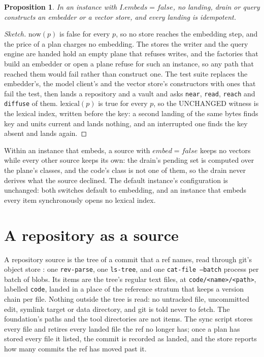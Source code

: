\documentclass[11pt]{article}
\theoremstyle{plain}
\newtheorem{proposition}{Proposition}
\theoremstyle{definition}
\theoremstyle{remark}
\newcommand{\code}[1]{\texttt{#1}}
\begin{document}
\begin{proposition}\label{prop:none}
In an instance with $I.\mathit{embeds}=\mathit{false}$, no landing, drain or query constructs an
embedder or a vector store, and every landing is idempotent.
\end{proposition}
\begin{proof}[Sketch]
$\mathrm{now}(p)$ is false for every $p$, so no store reaches the embedding step, and the price of a
plan charges no embedding. The stores the writer and the query engine are handed hold an empty
plane that refuses writes, and the factories that build an embedder or open a plane refuse for such
an instance, so any path that reached them would fail rather than construct one. The test suite
replaces the embedder's, the model client's and the vector store's constructors with ones that fail
the test, then lands a repository and a vault and asks \code{near}, \code{read}, \code{reach} and
\code{diffuse} of them.
$\mathrm{lexical}(p)$ is true for every $p$, so the UNCHANGED witness is the lexical index, written
before the key: a second landing of the same bytes finds key and units current and lands nothing,
and an interrupted one finds the key absent and lands again.
\end{proof}

Within an instance that embeds, a source with $\mathit{embed}=\mathit{false}$ keeps no vectors
while every other source keeps its own: the drain's pending set is computed over the plane's
classes, and the code's class is not one of them, so the drain never derives what the source
declined. The default instance's configuration is unchanged: both switches default to embedding,
and an instance that embeds every item synchronously opens no lexical index.

\section{A repository as a source}\label{sec:repo}

A repository source is the tree of a commit that a ref names, read through git's object store
\citep{chacon2014progit}: one \code{rev-parse}, one \code{ls-tree}, and one \code{cat-file
--batch} process per batch of blobs. Its items are the tree's regular text files, at
\code{code/<name>/<path>}, labelled \code{code}, landed in a place of the reference stratum that
keeps a version chain per file. Nothing outside the tree is read: no untracked file, uncommitted
edit, symlink target or data directory, and git is told never to fetch. The foundation's paths and
the tool directories are not items. The sync script stores every file and retires every landed file
the ref no longer has; once a plan has stored every file it listed, the commit is recorded as
landed, and the store reports how many commits the ref has moved past it.
\end{document}
